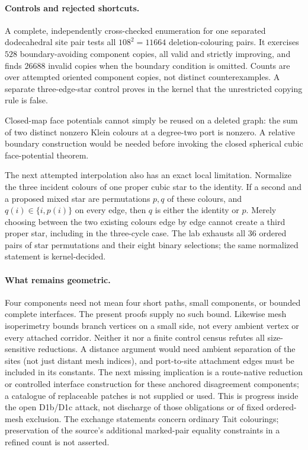 \paragraph{Controls and rejected shortcuts.}
A complete, independently cross-checked enumeration for one separated
dodecahedral site pair tests all $108^2=11664$ deletion-colouring pairs.
It exercises $528$ boundary-avoiding component copies, all valid and
strictly improving, and finds $26688$ invalid copies when the boundary
condition is omitted. Counts are over attempted oriented component copies,
not distinct counterexamples. A separate three-edge-star control proves
in the kernel that the unrestricted copying rule is false.

Closed-map face potentials cannot simply be reused on a deleted graph:
the sum of two distinct nonzero Klein colours at a degree-two port is
nonzero. A relative boundary construction would be needed before invoking
the closed spherical cubic face-potential theorem.

The next attempted interpolation also has an exact local limitation.
Normalize the three incident colours of one proper cubic star to the
identity. If a second and a proposed mixed star are permutations $p,q$
of these colours, and $q(i)\in\{i,p(i)\}$ on every edge, then $q$ is
either the identity or $p$. Merely choosing between the two existing
colours edge by edge cannot create a third proper star, including in the
three-cycle case. The lab exhausts all $36$ ordered pairs of star
permutations and their eight binary selections; the same normalized
statement is kernel-decided.

\paragraph{What remains geometric.}
Four components need not mean four short paths, small components, or
bounded complete interfaces. The present proofs supply no such bound.
Likewise mesh isoperimetry bounds branch vertices on a small side, not
every ambient vertex or every attached corridor. Neither it nor a finite
control census refutes all size-sensitive reductions. A distance argument
would need ambient separation of the sites (not just distant mesh indices),
and port-to-site attachment edges must be included in its constants.
The next missing implication is a route-native reduction or controlled
interface construction for these anchored disagreement components; a
catalogue of replaceable patches is not supplied or used. This is progress
inside the open D1b/D1c attack, not discharge of those obligations or of
fixed ordered-mesh exclusion. The exchange statements concern ordinary Tait colourings; preservation of
the source's additional marked-pair equality constraints in a refined
count is not asserted.

